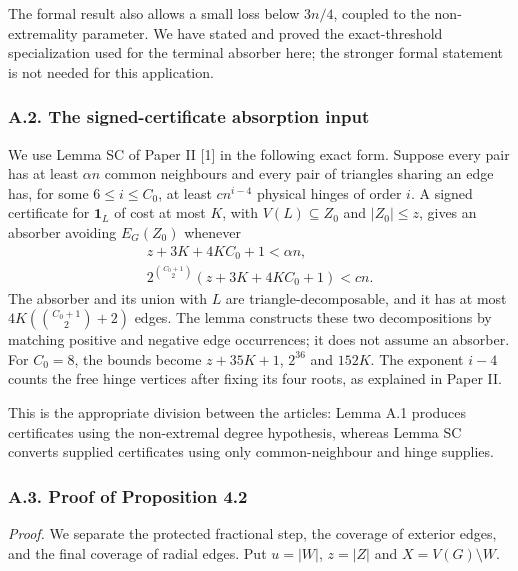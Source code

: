 \documentclass[english,11pt,a4paper]{article}
\begin{document}
The formal result also allows a small loss below \(3n/4\), coupled to the non-extremality parameter. We have stated and proved the exact-threshold specialization used for the terminal absorber here; the stronger formal statement is not needed for this application.

\subsubsection{A.2. The signed-certificate absorption input}\label{a.2.-the-signed-certificate-absorption-input}

We use Lemma SC of Paper II {[}1{]} in the following exact form. Suppose every pair has at least \(\alpha n\) common neighbours and every pair of triangles sharing an edge has, for some \(6\le i\le C_0\), at least \(cn^{i-4}\) physical hinges of order \(i\). A signed certificate for \(\mathbf1_L\) of cost at most \(K\), with \(V(L)\subseteq Z_0\) and \(|Z_0|\le z\), gives an absorber avoiding \(E_G(Z_0)\) whenever \[\begin{gathered}
z+3K+4KC_0+1<\alpha n,\\
2^{\binom{C_0+1}{2}}(z+3K+4KC_0+1)<cn.
\end{gathered}
\tag{A.3}\] The absorber and its union with \(L\) are triangle-decomposable, and it has at most \(4K(\binom{C_0+1}{2}+2)\) edges. The lemma constructs these two decompositions by matching positive and negative edge occurrences; it does not assume an absorber. For \(C_0=8\), the bounds become \(z+35K+1\), \(2^{36}\) and \(152K\). The exponent \(i-4\) counts the free hinge vertices after fixing its four roots, as explained in Paper II.

This is the appropriate division between the articles: Lemma A.1 produces certificates using the non-extremal degree hypothesis, whereas Lemma SC converts supplied certificates using only common-neighbour and hinge supplies.

\subsubsection{A.3. Proof of Proposition 4.2}\label{a.3.-proof-of-proposition-4.2}

\emph{Proof.} We separate the protected fractional step, the coverage of exterior edges, and the final coverage of radial edges. Put \(u=|W|\), \(z=|Z|\) and \(X=V(G)\setminus W\).
\end{document}
